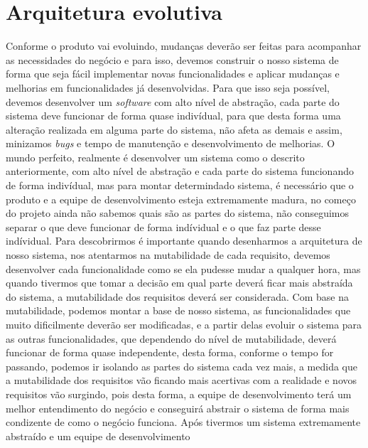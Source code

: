     \section{Arquitetura evolutiva}
      Conforme o produto vai evoluindo, mudanças deverão ser feitas para acompanhar
      as necessidades do negócio e para isso, devemos construir o nosso sistema de
      forma que seja fácil implementar novas funcionalidades e aplicar mudanças e
      melhorias em funcionalidades já desenvolvidas. Para que isso seja possível,
      devemos desenvolver um \textit{software} com alto nível de abstração, cada
      parte do sistema deve funcionar de forma quase indivídual, para que desta
      forma uma alteração realizada em alguma parte do sistema, não afeta as demais
      e assim, minizamos \textit{bugs} e tempo de manutenção e desenvolvimento de
      melhorias. \newline
      O mundo perfeito, realmente é desenvolver um sistema como o descrito anteriormente,
      com alto nível de abstração e cada parte do sistema funcionando de forma indivídual,
      mas para montar determindado sistema, é necessário que o produto e a equipe
      de desenvolvimento esteja extremamente madura, no começo do projeto ainda não
      sabemos quais são as partes do sistema, não conseguimos separar o que deve
      funcionar de forma indívidual e o que faz parte desse indívidual. Para
      descobrirmos é importante quando desenharmos a arquitetura de nosso sistema,
      nos atentarmos na mutabilidade de cada requisito, devemos desenvolver cada
      funcionalidade como se ela pudesse mudar a qualquer hora, mas quando tivermos
      que tomar a decisão em qual parte deverá ficar mais abstraída do sistema,
      a mutabilidade dos requisitos deverá ser considerada. Com base na mutabilidade,
      podemos montar a base de nosso sistema, as funcionalidades que muito dificilmente
      deverão ser modificadas, e a partir delas evoluir o sistema para as outras
      funcionalidades, que dependendo do nível de mutabilidade, deverá funcionar de
      forma quase independente, desta forma, conforme o tempo for passando, podemos
      ir isolando as partes do sistema cada vez mais, a medida que a mutabilidade
      dos requisitos vão ficando mais acertivas com a realidade e novos requisitos
      vão surgindo, pois desta forma, a equipe de desenvolvimento terá um melhor
      entendimento do negócio e conseguirá abstrair o sistema de forma mais condizente
      de como o negócio funciona. \newline
      Após tivermos um sistema extremamente abstraído e um equipe de desenvolvimento
